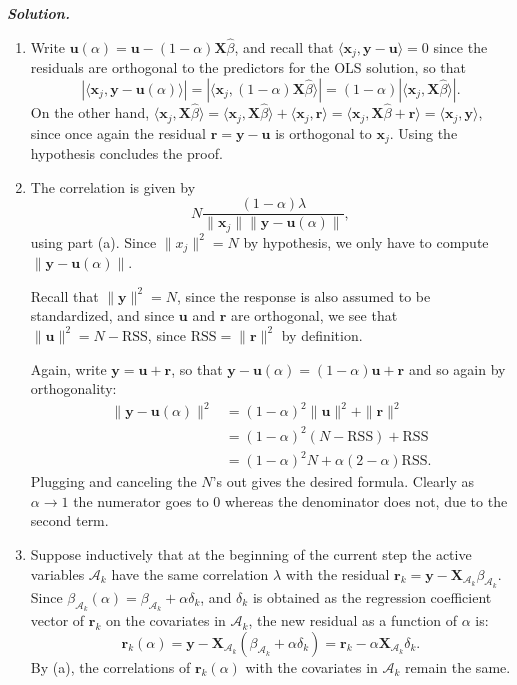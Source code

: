 \documentclass[12pt]{article}
\def\cA{\mathcal{A}}
\def\bx{\textbf{x}}
\def\bX{\textbf{X}}
\def\bu{\textbf{u}}
\def\by{\textbf{y}}
\def\br{\textbf{r}}
\def\RSS{\text{RSS}}
\newenvironment{solution}[1][\it{Solution}]{\textbf{#1. } }{\vspace{.5cm}}
\begin{document}
\begin{solution}
\begin{enumerate}
	\item [(a)] Write $\bu(\alpha) = \bu - (1-\alpha) \bX \hat{\beta}$, and recall that $\langle \bx_j, \by - \bu \rangle = 0$ since the residuals are orthogonal to the predictors for the OLS solution, so that 
$$|\langle \bx_j, \by - \bu(\alpha) \rangle|  = |\langle \bx_j, (1-\alpha) \bX \hat{\beta} \rangle| = (1-\alpha) |\langle \bx_j,  \bX \hat{\beta} \rangle|.$$
On the other hand, $\langle \bx_j,  \bX \hat{\beta} \rangle = \langle \bx_j,  \bX \hat{\beta} \rangle + \langle \bx_j, \br \rangle = \langle \bx_j,  \bX \hat{\beta}  + \br \rangle = \langle \bx_j,  \by\rangle$, since once again the residual $\br = \by - \bu$ is orthogonal to $\bx_j$. Using the hypothesis concludes the proof.

\item [(b)] The correlation is given by 
$$N\frac{(1-\alpha)\lambda}{\|\bx_j\| \|\by - \bu(\alpha)\|},$$
using part (a). Since $\|x_j\|^2 = N$ by hypothesis, we only have to compute $\|\by - \bu(\alpha)\|$. 

Recall that $\|\by\|^2 = N$, since the response is also assumed to be standardized, and since $\bu $ and $\br$ are orthogonal, we see that $\|\bu\|^2 = N-\RSS$, since $\RSS = \|\br\|^2$ by definition.  

Again, write $\by = \bu + \br$, so that $\by - \bu(\alpha) = (1-\alpha)\bu + \br$ and so again by orthogonality:
 $$\begin{aligned}\|\by - \bu(\alpha)\|^2 &=(1-\alpha)^2 \|\bu\|^2 + \|\br\|^2 \\
 & = (1-\alpha)^2(N-\RSS) + \RSS \\
 &= (1-\alpha)^2 N + \alpha(2-\alpha) \RSS.
\end{aligned}
$$
Plugging and canceling the $N$'s out gives the desired formula. Clearly as $\alpha \to 1$ the numerator goes to 0 whereas the denominator does not, due to the second term.

\item [(c)] Suppose inductively that at the beginning of the current step the active variables $\cA_k$ have the same correlation $\lambda$ with the residual $\br_k = \by - \bX_{\cA_k} \beta_{\cA_k}$. Since $\beta_{\cA_k}(\alpha) = \beta_{\cA_k} + \alpha \delta_k$, and $\delta_k$ is obtained as the regression coefficient vector of $\br_k$ on the covariates in $\cA_k$, the new residual as a function of $\alpha$ is:
$$\br_k(\alpha) = \by - \bX_{\cA_k}(\beta_{\cA_k} + \alpha \delta_k) = \br_k - \alpha \bX_{\cA_k} \delta_k.$$
By (a), the correlations of $\br_k(\alpha)$ with the covariates in $\cA_k$ remain the same.
	
\end{enumerate}
\end{solution}
\end{document}
